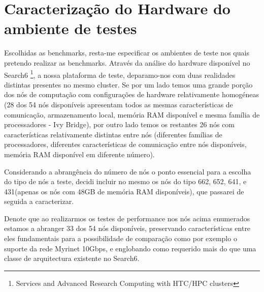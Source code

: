 \documentclass[conference,compsoc]{IEEEtran}
\begin{document}
\section{Caracterização do Hardware do ambiente de testes}
Escolhidas as benchmarks, resta-me especificar os ambientes de teste nos quais pretendo realizar as benchmarks. Através da análise do hardware disponível no Search6 \footnote{Services and Advanced Research Computing with HTC/HPC clusters}, a nossa plataforma de teste, deparamo-nos com duas 
realidades distintas presentes no mesmo cluster. Se por um lado temos uma grande porção dos nós de computação com configurações de hardware relativamente homogéneas (28 dos 54 nós disponíveis apresentam todos as mesmas características de comunicação, armazenamento local, memória RAM disponível e mesma família de processadores - Ivy Bridge), por outro lado temos os restantes 26 nós com características relativamente distintas entre nós (diferentes famílias de processadores, diferentes características de comunicação entre nós disponíveis, memória RAM disponível em diferente número). \par 
Considerando a abrangência do número de nós o ponto essencial para a escolha do tipo de nós a teste, decidi incluir no mesmo os nós do tipo 662, 652, 641, e 431(apenas os nós com 48GB de memória RAM disponíveis), que passarei de seguida a caracterizar. \par 
Denote que ao realizarmos os testes de performance nos nós acima enumerados estamos a abranger 33 dos 54 nós disponíveis, preservando características entre eles fundamentais para a possibilidade de comparação como por exemplo o suporte da rede Myrinet 10Gbps, e englobando como requerido mais do que uma classe de arquitectura existente no Search6.\par 
\end{document}
